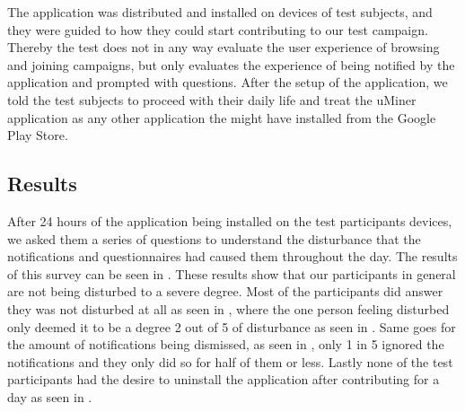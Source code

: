 The application was distributed and installed on devices of test subjects, and they were guided to how they could start contributing to our test campaign. Thereby the test does not in any way evaluate the user experience of browsing and joining campaigns, but only evaluates the experience of being notified by the application and prompted with questions. After the setup of the application, we told the test subjects to proceed with their daily life and treat the uMiner application as any other application the might have installed from the Google Play Store. 

\subsection{Results}
\label{sub:results}
After 24 hours of the application being installed on the test participants devices, we asked them a series of questions to understand the disturbance that the notifications and questionnaires had caused them throughout the day. The results of this survey can be seen in . These results show that our participants in general are not being disturbed to a severe degree. Most of the participants did answer they was not disturbed at all as seen in , where the one person feeling disturbed only deemed it to be a degree 2 out of 5 of disturbance as seen in . Same goes for the amount of notifications being dismissed, as seen in , only 1 in 5 ignored the notifications and they only did so for half of them or less. Lastly none of the test participants had the desire to uninstall the application after contributing for a day as seen in .


